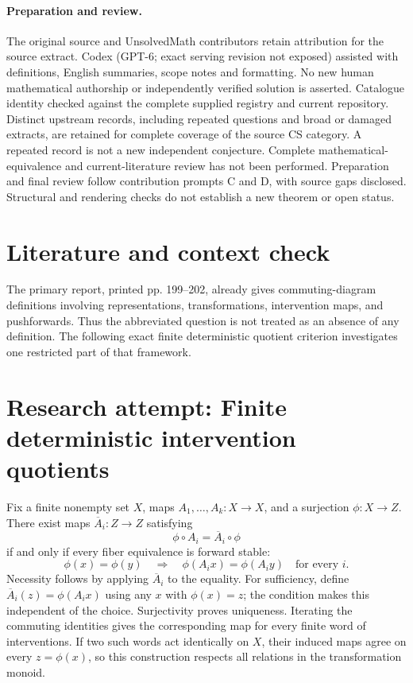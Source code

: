 \documentclass[11pt]{article}
\begin{document}
\paragraph{Preparation and review.}
The original source and UnsolvedMath contributors retain attribution for the source extract. Codex (GPT-6; exact serving revision not exposed) assisted with definitions, English summaries, scope notes and formatting. No new human mathematical authorship or independently verified solution is asserted. Catalogue identity checked against the complete supplied registry and current repository. Distinct upstream records, including repeated questions and broad or damaged extracts, are retained for complete coverage of the source CS category. A repeated record is not a new independent conjecture. Complete mathematical-equivalence and current-literature review has not been performed. Preparation and final review follow contribution prompts C and D, with source gaps disclosed. Structural and rendering checks do not establish a new theorem or open status.
\label{end:statement}

\section{Literature and context check}
The primary report, printed pp. 199--202, already gives commuting-diagram definitions involving representations, transformations, intervention maps, and pushforwards. Thus the abbreviated question is not treated as an absence of any definition. The following exact finite deterministic quotient criterion investigates one restricted part of that framework.
\section{Research attempt: Finite deterministic intervention quotients}

Fix a finite nonempty set $X$, maps $A_1,\ldots,A_k:X\to X$, and a surjection $\phi:X\to Z$. There exist maps $\overline A_i:Z\to Z$ satisfying
\[
\phi\circ A_i=\overline A_i\circ\phi
\]
if and only if every fiber equivalence is forward stable:
\[
\phi(x)=\phi(y)\quad\Longrightarrow\quad
\phi(A_i x)=\phi(A_i y)\quad\text{for every }i.
\]
Necessity follows by applying $\overline A_i$ to the equality. For sufficiency, define $\overline A_i(z)=\phi(A_i x)$ using any $x$ with $\phi(x)=z$; the condition makes this independent of the choice. Surjectivity proves uniqueness. Iterating the commuting identities gives the corresponding map for every finite word of interventions. If two such words act identically on $X$, their induced maps agree on every $z=\phi(x)$, so this construction respects all relations in the transformation monoid.
\end{document}
